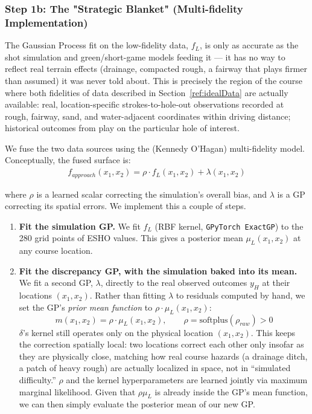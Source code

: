 \documentclass[11pt, letterpaper]{article}
\begin{document}
\subsubsection{Step 1b: The "Strategic Blanket" (Multi-fidelity Implementation)}

The Gaussian Process fit on the low-fidelity data, $f_L$, is only as accurate as the shot simulation and green/short-game models feeding it --- it has no way to reflect real terrain effects (drainage, compacted rough, a fairway that plays firmer than assumed) it was
never told about. This is precisely the region of the course where both fidelities of data described in Section~\ref{ref:idealData} are actually available: real, location-specific strokes-to-hole-out observations recorded at rough, fairway, sand, and water-adjacent
coordinates within driving distance; historical outcomes from play on the particular hole of interest.

We fuse the two data sources using the \newcite (Kennedy O'Hagan) multi-fidelity model. Conceptually, the fused surface is:
\begin{align}
f_{approach}(x_1,x_2) = \rho \cdot f_{L}(x_1,x_2) + \lambda(x_1,x_2)    
\end{align}

where $\rho$ is a learned scalar correcting the simulation's overall bias, and $\lambda$ is a GP correcting its spatial errors. We implement this a couple of steps.

\begin{enumerate}
    \item \textbf{Fit the simulation GP.} We fit $f_{L}$ (RBF kernel, \texttt{GPyTorch ExactGP}) to the 280 grid points of ESHO values. This gives a posterior mean $\mu_{L}(x_1,x_2)$ at any course location.

    \item \textbf{Fit the discrepancy GP, with the simulation baked into its mean.} We fit a second GP, $\lambda$, directly to the real observed outcomes $y_H$ at their locations $(x_1,x_2)$. Rather than fitting $\lambda$ to residuals computed by hand, we set the GP's \emph{prior mean function} to $\rho \cdot \mu_{L}(x_1,x_2)$:
    $$m(x_1,x_2) = \rho \cdot \mu_{L}(x_1,x_2), \qquad \rho = \text{softplus}(\rho_{raw}) > 0$$
     $\delta$'s kernel still operates only on the physical location $(x_1,x_2)$. This keeps the correction spatially local: two locations correct each other only insofar as they are physically close, matching how real course hazards (a drainage ditch, a patch of heavy rough) are actually localized in space, not in ``simulated difficulty.'' $\rho$ and the kernel hyperparameters are learned jointly via maximum marginal likelihood. Given that $\rho\mu_{L}$ is already inside the GP's mean function, we can then simply evaluate the posterior mean of our new GP.
\end{enumerate}
\end{document}
